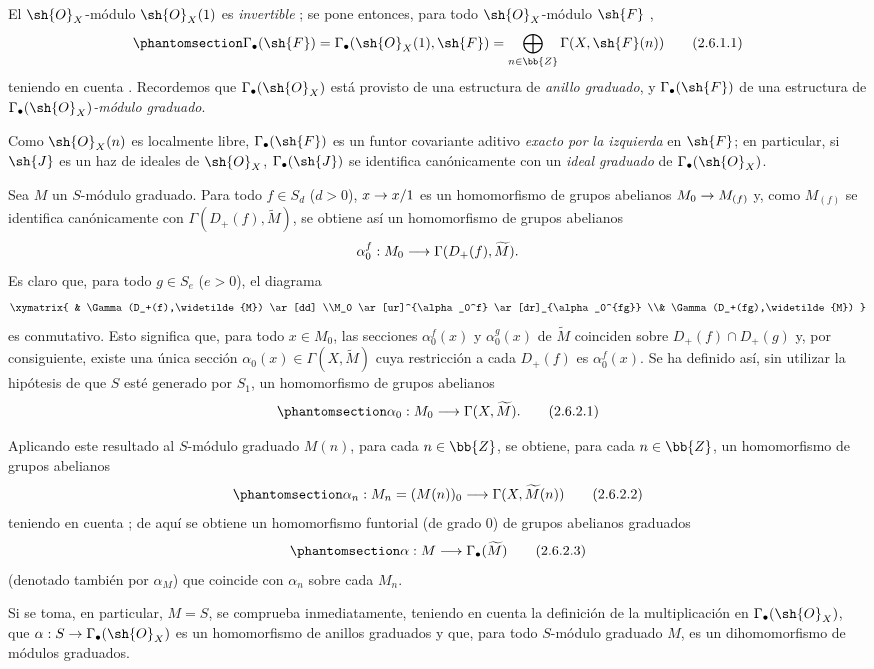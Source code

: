 \documentclass[oneside,10pt]{amsart}
\makeatletter
\newcommand{\ega@arrow}[2]{\mathchoice{#1}{#2}{#2}{#2}}
\renewcommand{\to}{\ega@arrow{\longrightarrow}{\rightarrow}}
\newcommand{\oldpage}[2][]{\marginnote{\normalfont\footnotesize\textbf{#1}~|~#2}\ignorespaces}
\let\EGAOriginalLabel\label
\renewcommand{\label}[1]{\phantomsection\EGAOriginalLabel{#1}}
\makeatother
\begin{document}
\begin{env}[2.6.1]
\label{II.2.6.1}
El $\sh{O}_X$-módulo $\sh{O}_X(1)$ es \emph{invertible} ; se pone entonces, para todo $\sh{O}_X$-módulo $\sh{F}$ ,
\[
\label{II.2.6.1.1}
  \Gamma_\bullet(\sh{F})
  =\Gamma_\bullet(\sh{O}_X(1),\sh{F})
  =\bigoplus_{n\in\bb{Z}}\Gamma(X,\sh{F}(n))
\tag{2.6.1.1}
\]
teniendo en cuenta .
Recordemos  que $\Gamma_\bullet(\sh{O}_X)$ está provisto de una estructura de \emph{anillo graduado}, y $\Gamma_\bullet(\sh{F})$ de una estructura de \emph{$\Gamma_\bullet(\sh{O}_X)$-módulo graduado}.

Como $\sh{O}_X(n)$ es localmente libre, $\Gamma_\bullet(\sh{F})$ es un funtor covariante aditivo \emph{exacto por la izquierda} en $\sh{F}$; en particular, si $\sh{J}$ es un haz de ideales de $\sh{O}_X$, $\Gamma_\bullet(\sh{J})$ se identifica canónicamente con un \emph{ideal graduado} de $\Gamma_\bullet(\sh{O}_X)$.
\end{env}

\begin{env}[2.6.2]
\label{II.2.6.2}
Sea $M$ un $S$-módulo graduado.
Para todo $f\in S_d$ ($d>0$), $x\to x/1$ es un homomorfismo de grupos abelianos $M_0\to M_{(f)}$ y, como $M_{(f)}$ se identifica canónicamente
\oldpage[II]{37}
con $\Gamma(D_+(f),\widetilde{M})$, se obtiene así un homomorfismo de grupos abelianos
\[
  \alpha_0^f:M_0\to\Gamma(D_+(f),\widetilde{M}).
\]
Es claro que, para todo $g\in S_e$ ($e>0$), el diagrama
\[
  \xymatrix{
    & \Gamma(D_+(f),\widetilde{M}) \ar[dd]
  \\M_0 \ar[ur]^{\alpha_0^f} \ar[dr]_{\alpha_0^{fg}}
  \\& \Gamma(D_+(fg),\widetilde{M})
  }
\]
es conmutativo.
Esto significa que, para todo $x\in M_0$, las secciones $\alpha_0^f(x)$ y $\alpha_0^g(x)$ de $\widetilde{M}$ coinciden sobre $D_+(f)\cap D_+(g)$ y, por consiguiente, existe una única sección $\alpha_0(x)\in\Gamma(X,\widetilde{M})$ cuya restricción a cada $D_+(f)$ es $\alpha_0^f(x)$.
Se ha definido así, sin utilizar la hipótesis de que $S$ esté generado por $S_1$, un homomorfismo de grupos abelianos
\[
\label{II.2.6.2.1}
  \alpha_0:M_0\to\Gamma(X,\widetilde{M}).
\tag{2.6.2.1}
\]

Aplicando este resultado al $S$-módulo graduado $M(n)$, para cada $n\in\bb{Z}$, se obtiene, para cada $n\in\bb{Z}$, un homomorfismo de grupos abelianos
\[
\label{II.2.6.2.2}
  \alpha_n:M_n=(M(n))_0\to\Gamma(X,\widetilde{M}(n))
\tag{2.6.2.2}
\]
teniendo en cuenta ; de aquí se obtiene un homomorfismo funtorial (de grado $0$) de grupos abelianos graduados
\[
\label{II.2.6.2.3}
  \alpha:M\to\Gamma_\bullet(\widetilde{M})
\tag{2.6.2.3}
\]
(denotado también por $\alpha_M$) que coincide con $\alpha_n$ sobre cada $M_n$.

Si se toma, en particular, $M=S$, se comprueba inmediatamente, teniendo en cuenta la definición  de la multiplicación en $\Gamma_\bullet(\sh{O}_X)$, que $\alpha:S\to\Gamma_\bullet(\sh{O}_X)$ es un homomorfismo de anillos graduados y que, para todo $S$-módulo graduado $M$,  es un dihomomorfismo de módulos graduados.
\end{env}
\end{document}

